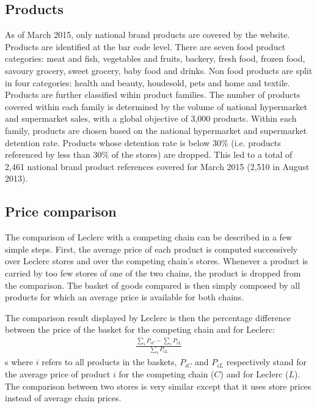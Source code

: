 \documentclass[11pt]{article}
\begin{document}
\subsection{Products}

As of March 2015, only national brand products are covered by the website. Products are identified at the bar code level. There are seven food product categories: meat and fish, vegetables and fruits, backery, fresh food, frozen food, savoury grocery, sweet grocery, baby food and drinks. Non food products are split in four categories: health and beauty, houdesold, pets and home and textile. Products are further classified wihin product families. The number of products covered within each family is determined by the volume of national hypermarket and supermarket sales, with a global objective of 3,000 products. Within each family, products are chosen based on the national hypermarket and supermarket detention rate. Products whose detention rate is below 30\% (i.e. products referenced by less than 30\% of the stores) are dropped. This led to a total of 2,461 national brand product references covered for March 2015 (2,510 in August 2013).

\subsection{Price comparison}

The comparison of Leclerc with a competing chain can be described in a few simple steps. First, the average price of each product is computed successively over Leclerc stores and over the competing chain's stores. Whenever a product is carried by too few stores of one of the two chains, the product is dropped from the comparison. The basket of goods compared is then simply composed by all products for which an average price is available for both chains.

The comparison result displayed by Leclerc is then the percentage difference between the price of the basket for the competing chain and for Leclerc:
\begin{align*}
\frac{\sum\limits_{i} P_{iC} - \sum\limits_{i} P_{iL}}{\sum\limits_{i} P_{iL}}
\end{align*}s 
where $i$ refers to all products in the baskets, $P_{iC}$ and $P_{iL}$ respectively stand for the average price of product $i$ for the competing chain ($C$) and for Leclerc ($L$). The comparison between two stores is very similar except that it uses store prices instead of average chain prices.
\end{document}
